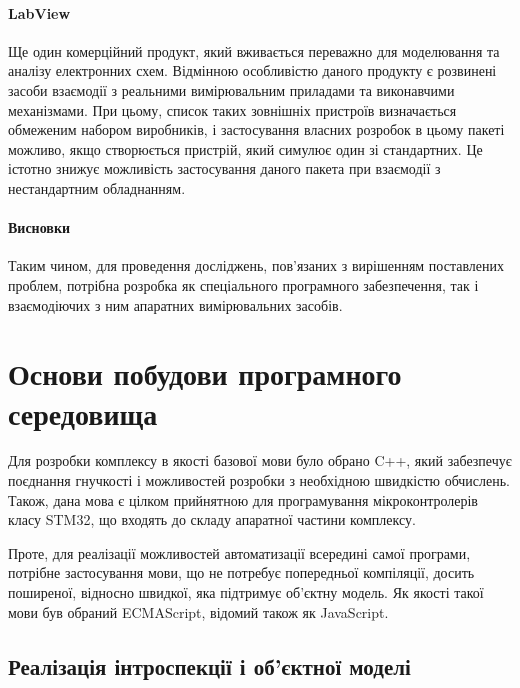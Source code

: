 \paragraph{LabView}

Ще один комерційний продукт, який вживається переважно для моделювання
та аналізу електронних схем. Відмінною особливістю даного
продукту є розвинені засоби взаємодії з реальними вимірювальним
приладами та виконавчими механізмами. При цьому, список таких
зовнішніх пристроїв визначається обмеженим набором виробників,
і застосування власних розробок в цьому пакеті можливо, якщо
створюється пристрій, який симулює один зі стандартних. Це істотно
знижує можливість застосування даного пакета при взаємодії з
нестандартним обладнанням.



\paragraph{Висновки}

Таким чином, для проведення досліджень, пов'язаних з вирішенням
поставлених проблем, потрібна розробка як спеціального
програмного забезпечення, так і взаємодіючих з ним апаратних
вимірювальних засобів.





\section{Основи побудови програмного середовища} %

Для розробки комплексу в якості базової мови було обрано C++,
який забезпечує поєднання гнучкості і можливостей розробки
з необхідною швидкістю обчислень. Також, дана мова є цілком
прийнятною для програмування мікроконтролерів класу STM32, що
входять до складу апаратної частини комплексу.

Проте, для реалізації можливостей автоматизації всередині самої
програми, потрібне застосування мови, що не потребує попередньої
компіляції, досить поширеної, відносно швидкої, яка підтримує об'єктну
модель. Як якості такої мови був обраний ECMAScript, відомий також як JavaScript.

\subsection{Реалізація інтроспекції і об'єктної моделі} %

